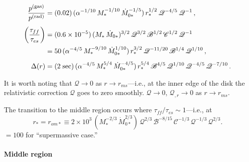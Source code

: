 \begin{align}
\frac{p^{(\text{gas})}}{p^{(\text{rad})}}
&= (0.02)\,(\alpha^{-1/10}\,M_*^{-1/10}\,\dot{M}_{0*}^{-1/5})\,
   r_*^{1/2}\,\mathscr{Q}^{-4/5}\,\mathscr{Q}^{-1}\,, \notag \\[4pt]
%
\biggl(\frac{\tau_{ff}}{\tau_{es}}\biggr)
&= (0.6 \times 10^{-5})\,
  (M_*\,\dot{M}_{0*})^{3/2}\,
  \mathscr{Q}^{3/2}\,\mathscr{B}^{1/2}\,\mathscr{C}^{1/2}\,\mathscr{Q}^{-1} \notag \\
&= 50\,(\alpha^{-4/5}\,M_*^{-9/10}\,\dot{M}_{0*}^{1/10})\,
   r_*^{3/2}\,
   \mathscr{Q}^{-11/20}\,\mathscr{B}^{1/4}\,\mathscr{Q}^{1/10}\,, \notag \\[4pt]
%
\Delta(r)
&= (2\;\text{sec})\,(\alpha^{-4/5}\,M_*^{5/4}\,\dot{M}_{0*}^{-4/5})\,
   r_*^{5/4}\,\mathscr{B}^{4/5}\,\mathscr{Q}^{1/10}\,\mathscr{Q}^{-4/5}\,\mathscr{Q}^{-7/10}\,.
   \notag
\end{align}

It is worth noting that $\mathscr{Q} \to 0$ as $r \to r_{ms}$---i.e., at
the inner edge of the disk the relativistic correction $\mathscr{Q}$ goes to zero smoothly.
$\mathscr{Q} \to 0$, $\mathscr{Q}_{,r} \to 0$ as $r \to r_{ms}$.

The transition to the middle region occurs where $\tau_{ff}/\tau_{es} \sim 1$---i.e., at
%
\begin{equation}
\tag{5.9.7}
r_* = r_{om*}
\equiv 2 \times 10^3\,
(M_*^{-2/3}\,\dot{M}_{0*}^{2/3})\,
\mathscr{Q}^{2/3}\,\mathscr{B}^{-8/15}\,\mathscr{C}^{-1/3}\,\mathscr{Q}^{-1/3}\,\mathscr{Q}^{2/3}.
\end{equation}
%
$= 100$ for ``supermassive case.''

\paragraph{Middle region}

